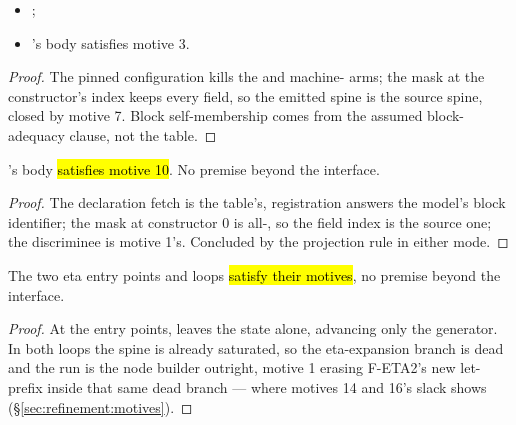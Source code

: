 \begin{lemma}
\label{lem:step_visitConstructor}
\leanok
{}
\begin{itemize}
\item {} ;
\item {} 's body satisfies motive 3.
\end{itemize}
\end{lemma}
\begin{proof}
\leanok
{}
 The pinned configuration kills the  and machine- arms; the mask at
the constructor's index keeps every field, so the emitted spine is the source spine, closed by motive 7.
Block self-membership comes from the assumed block-adequacy clause, not the table.
\end{proof}

\begin{lemma}
\label{lem:step_visitProj}
\leanok
{}
 's body \hl{satisfies motive 10}. No premise beyond the interface.
\end{lemma}
\begin{proof}
\leanok
{}
 The declaration fetch is the table's, registration answers the model's block identifier; the
mask at constructor $0$ is all-, so the field index is the source one; the discriminee is
motive 1's. Concluded by the projection rule in either mode.
\end{proof}

\begin{lemma}
\label{lem:step_visitCtorEta}
\leanok
{}
 The two eta entry points and loops \hl{satisfy their motives}, no premise beyond the
interface.
\end{lemma}
\begin{proof}
\leanok
{}
 At the entry points,  leaves the state alone, advancing only the generator.
In both loops the spine is already saturated, so the eta-expansion branch is dead and the run is the node
builder outright, motive 1 erasing F-ETA2's new let-prefix inside that same dead branch --- where
motives 14 and 16's slack shows (\S\ref{sec:refinement:motives}).
\end{proof}

